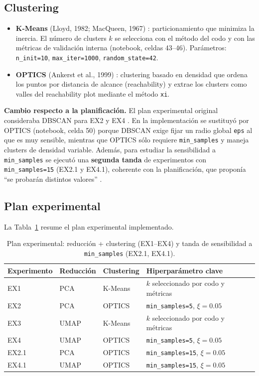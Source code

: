\documentclass[11pt,a4paper]{article}
\begin{document}
\subsection{Clustering}

\begin{itemize}
  \item \textbf{K-Means} (Lloyd, 1982; MacQueen, 1967) \cite{lloyd1982,macqueen1967}:
        particionamiento que minimiza la inercia. El número de clusters $k$ se selecciona con
        el método del codo y con las métricas de validación interna
        (notebook, celdas 43--46). Parámetros: \texttt{n\_init=10}, \texttt{max\_iter=1000},
        \texttt{random\_state=42}.
  \item \textbf{OPTICS} (Ankerst et al., 1999) \cite{ankerst1999}: clustering basado en
        densidad que ordena los puntos por distancia de alcance (reachability) y extrae los
        clusters como valles del reachability plot mediante el método \texttt{xi}.
\end{itemize}

\textbf{Cambio respecto a la planificación.} El plan experimental original consideraba
DBSCAN para EX2 y EX4 \cite{planificacion}. En la implementación se sustituyó por OPTICS
(notebook, celda 50) porque DBSCAN exige fijar un radio global \texttt{eps} al que es muy
sensible, mientras que OPTICS sólo requiere \texttt{min\_samples} y maneja clusters de
densidad variable. Además, para estudiar la sensibilidad a \texttt{min\_samples} se ejecutó
una \textbf{segunda tanda} de experimentos con \texttt{min\_samples=15} (EX2.1 y EX4.1),
coherente con la planificación, que proponía ``se probarán distintos valores''
\cite{planificacion}.

\subsection{Plan experimental}

La Tabla~\ref{tab:experimentos} resume el plan experimental implementado.

\begin{table}[H]
  \centering
  \caption{Plan experimental: reducción + clustering (EX1--EX4) y tanda de sensibilidad a \texttt{min\_samples} (EX2.1, EX4.1).}
  \label{tab:experimentos}
  \small
  \begin{tabular}{@{}llll@{}}
    \toprule
    \textbf{Experimento} & \textbf{Reducción} & \textbf{Clustering} & \textbf{Hiperparámetro clave} \\
    \midrule
    EX1 & PCA & K-Means & $k$ seleccionado por codo y métricas \\
    EX2 & PCA & OPTICS & \texttt{min\_samples=5}, $\xi=0.05$ \\
    EX3 & UMAP & K-Means & $k$ seleccionado por codo y métricas \\
    EX4 & UMAP & OPTICS & \texttt{min\_samples=5}, $\xi=0.05$ \\
    EX2.1 & PCA & OPTICS & \texttt{min\_samples=15}, $\xi=0.05$ \\
    EX4.1 & UMAP & OPTICS & \texttt{min\_samples=15}, $\xi=0.05$ \\
    \bottomrule
  \end{tabular}
\end{table}
\end{document}
